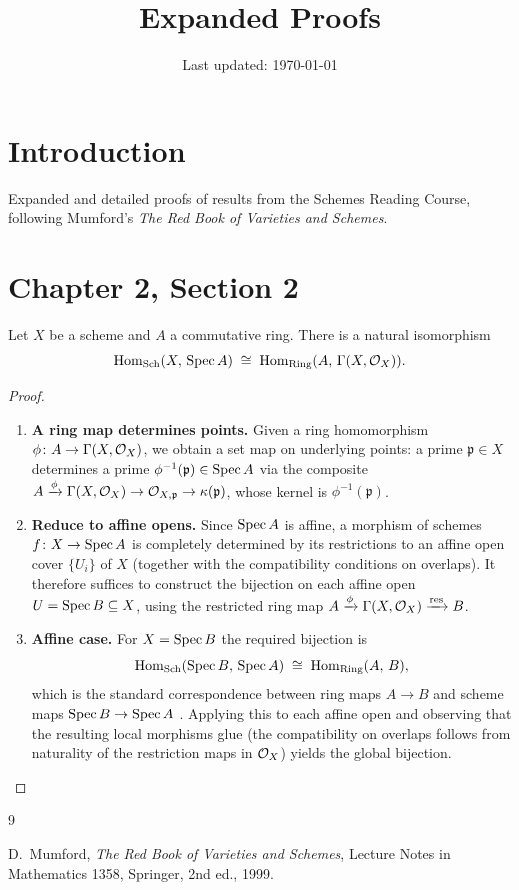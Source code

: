 \documentclass[a4paper, 12pt]{article}
\title{\textbf{Expanded Proofs}}
\author{}
\date{Last updated: \today}
\begin{document}
\maketitle


\section*{Introduction}
Expanded and detailed proofs of results from the Schemes Reading Course,
following Mumford's \emph{The Red Book of Varieties and Schemes}.

\section{Chapter 2, Section 2}

\begin{theorem}
  Let $X$ be a scheme and $A$ a commutative ring. There is a natural isomorphism
  \[
    \mathrm{Hom}_{\mathrm{Sch}}(X,\, \operatorname{Spec} A)
    \;\cong\;
    \mathrm{Hom}_{\mathrm{Ring}}(A,\, \Gamma(X, \mathcal{O}_X)).
  \]
\end{theorem}

\begin{proof}
  \begin{enumerate}
    \item \textbf{A ring map determines points.}
      Given a ring homomorphism $\phi \colon A \to \Gamma(X, \mathcal{O}_X)$, we
      obtain a set map on underlying points: a prime $\mathfrak{p} \in X$
      determines a prime $\phi^{-1}(\mathfrak{p}) \in \operatorname{Spec} A$ via the
      composite $A \xrightarrow{\phi} \Gamma(X,\mathcal{O}_X) \to \mathcal{O}_{X,\mathfrak{p}}
      \to \kappa(\mathfrak{p})$, whose kernel is $\phi^{-1}(\mathfrak{p})$.

    \item \textbf{Reduce to affine opens.}
      Since $\operatorname{Spec} A$ is affine, a morphism of schemes $f \colon X \to \operatorname{Spec} A$
      is completely determined by its restrictions to an affine open cover
      $\{U_i\}$ of $X$ (together with the compatibility conditions on overlaps).
      It therefore suffices to construct the bijection on each affine open
      $U = \operatorname{Spec} B \subseteq X$, using the restricted ring map
      $A \xrightarrow{\phi} \Gamma(X,\mathcal{O}_X) \xrightarrow{\mathrm{res}} B$.

    \item \textbf{Affine case.}
      For $X = \operatorname{Spec} B$ the required bijection is
      \[
        \mathrm{Hom}_{\mathrm{Sch}}(\operatorname{Spec} B,\, \operatorname{Spec} A)
        \;\cong\;
        \mathrm{Hom}_{\mathrm{Ring}}(A,\, B),
      \]
      which is the standard correspondence between ring maps $A \to B$ and
      scheme maps $\operatorname{Spec} B \to \operatorname{Spec} A$ \cite{Mumford}. Applying this to each
      affine open and observing that the resulting local morphisms glue
      (the compatibility on overlaps follows from naturality of the
      restriction maps in $\mathcal{O}_X$) yields the global bijection. \qedhere
  \end{enumerate}
\end{proof}


\begin{thebibliography}{9}

  D.~Mumford,
  \emph{The Red Book of Varieties and Schemes},
  Lecture Notes in Mathematics 1358,
  Springer, 2nd ed., 1999.

\end{thebibliography}
\end{document}
